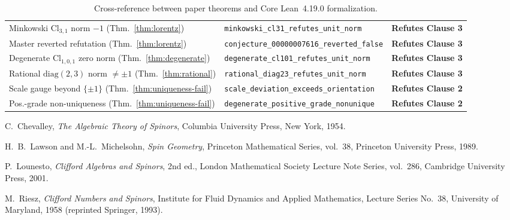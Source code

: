 \documentclass[11pt]{article}
\theoremstyle{definition}
\newcommand{\Cl}{\mathrm{Cl}}
\begin{document}
\begin{table}[ht]
\begin{tabular}{@{}lll@{}}
Minkowski $\Cl_{3,1}$ norm $-1$ (Thm.~\ref{thm:lorentz}) & \texttt{minkowski\_cl31\_refutes\_unit\_norm} & \textbf{Refutes Clause 3} \\
Master reverted refutation (Thm.~\ref{thm:lorentz}) & \texttt{conjecture\_00000007616\_reverted\_false} & \textbf{Refutes Clause 3} \\
Degenerate $\Cl_{1,0,1}$ zero norm (Thm.~\ref{thm:degenerate}) & \texttt{degenerate\_cl101\_refutes\_unit\_norm} & \textbf{Refutes Clause 3} \\
Rational $\mathrm{diag}(2,3)$ norm $\neq \pm 1$ (Thm.~\ref{thm:rational}) & \texttt{rational\_diag23\_refutes\_unit\_norm} & \textbf{Refutes Clause 3} \\
Scale gauge beyond $\{\pm 1\}$ (Thm.~\ref{thm:uniqueness-fail}) & \texttt{scale\_deviation\_exceeds\_orientation} & \textbf{Refutes Clause 2} \\
Pos.-grade non-uniqueness (Thm.~\ref{thm:uniqueness-fail}) & \texttt{degenerate\_positive\_grade\_nonunique} & \textbf{Refutes Clause 2} \\
\bottomrule
\end{tabular}
\caption{Cross-reference between paper theorems and Core Lean~4.19.0 formalization.}
\label{tab:xref}
\end{table}

\begin{thebibliography}{9}
C.~Chevalley, \emph{The Algebraic Theory of Spinors}, Columbia University Press, New York, 1954.

H.~B.~Lawson and M.-L.~Michelsohn, \emph{Spin Geometry}, Princeton Mathematical Series, vol.~38, Princeton University Press, 1989.

P.~Lounesto, \emph{Clifford Algebras and Spinors}, 2nd ed., London Mathematical Society Lecture Note Series, vol.~286, Cambridge University Press, 2001.

M.~Riesz, \emph{Clifford Numbers and Spinors}, Institute for Fluid Dynamics and Applied Mathematics, Lecture Series No.~38, University of Maryland, 1958 (reprinted Springer, 1993).
\end{thebibliography}
\end{document}

